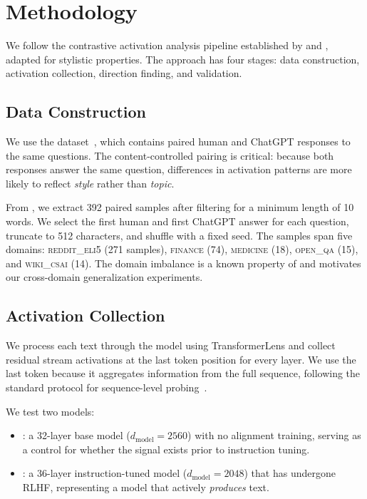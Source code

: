 \section{Methodology}
\label{sec:method}

We follow the contrastive activation analysis pipeline established by \citet{arditi2024refusal} and \citet{marks2024geometry}, adapted for stylistic properties.
The approach has four stages: data construction, activation collection, direction finding, and validation.

\subsection{Data Construction}
\label{sec:data}

We use the \hcthree dataset~\citep{guo2023hc3}, which contains paired human and ChatGPT responses to the same questions.
The content-controlled pairing is critical: because both responses answer the same question, differences in activation patterns are more likely to reflect \emph{style} rather than \emph{topic}.

From \hcthree, we extract 392 paired samples after filtering for a minimum length of 10 words.
We select the first human and first ChatGPT answer for each question, truncate to 512 characters, and shuffle with a fixed seed.
The samples span five domains: \textsc{reddit\_eli5} (271 samples), \textsc{finance} (74), \textsc{medicine} (18), \textsc{open\_qa} (15), and \textsc{wiki\_csai} (14).
The domain imbalance is a known property of \hcthree and motivates our cross-domain generalization experiments.

\subsection{Activation Collection}
\label{sec:activations}

We process each text through the model using TransformerLens and collect residual stream activations at the last token position for every layer.
We use the last token because it aggregates information from the full sequence, following the standard protocol for sequence-level probing~\citep{marks2024geometry}.

We test two models:
\begin{itemize}[leftmargin=*,itemsep=0pt,topsep=0pt]
    \item \pythia: a 32-layer base model ($d_\text{model} = 2560$) with no alignment training, serving as a control for whether the signal exists prior to instruction tuning.
    \item \qwen: a 36-layer instruction-tuned model ($d_\text{model} = 2048$) that has undergone RLHF, representing a model that actively \emph{produces} \aistyle text.
\end{itemize}

